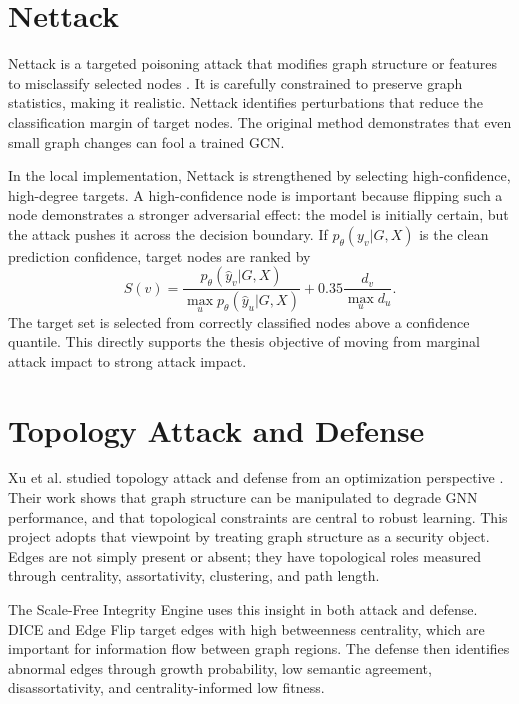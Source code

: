 \documentclass[12pt,oneside]{report}
\begin{document}
\section{Nettack}
Nettack is a targeted poisoning attack that modifies graph structure or features to misclassify selected nodes \cite{zugner2018nettack}. It is carefully constrained to preserve graph statistics, making it realistic. Nettack identifies perturbations that reduce the classification margin of target nodes. The original method demonstrates that even small graph changes can fool a trained GCN.

In the local implementation, Nettack is strengthened by selecting high-confidence, high-degree targets. A high-confidence node is important because flipping such a node demonstrates a stronger adversarial effect: the model is initially certain, but the attack pushes it across the decision boundary. If \(p_\theta(y_v|G,X)\) is the clean prediction confidence, target nodes are ranked by
\begin{equation}
S(v)=\frac{p_\theta(\hat{y}_v|G,X)}{\max_u p_\theta(\hat{y}_u|G,X)}+
0.35\frac{d_v}{\max_u d_u}.
\end{equation}
The target set is selected from correctly classified nodes above a confidence quantile. This directly supports the thesis objective of moving from marginal attack impact to strong attack impact.

\section{Topology Attack and Defense}
Xu et al. studied topology attack and defense from an optimization perspective \cite{xu2019topology}. Their work shows that graph structure can be manipulated to degrade GNN performance, and that topological constraints are central to robust learning. This project adopts that viewpoint by treating graph structure as a security object. Edges are not simply present or absent; they have topological roles measured through centrality, assortativity, clustering, and path length.

The Scale-Free Integrity Engine uses this insight in both attack and defense. DICE and Edge Flip target edges with high betweenness centrality, which are important for information flow between graph regions. The defense then identifies abnormal edges through growth probability, low semantic agreement, disassortativity, and centrality-informed low fitness.
\end{document}
